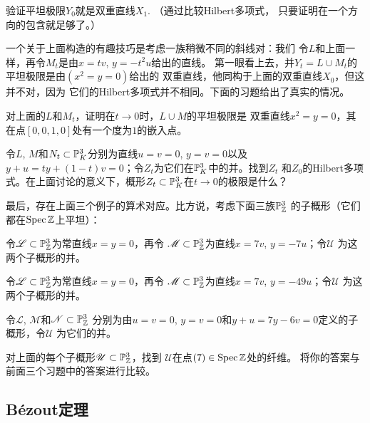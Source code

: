 \begin{exe}\label{exe:3.67}
验证平坦极限$Y_0$就是双重直线$X_1$. （通过比较Hilbert多项式，
只要证明在一个方向的包含就足够了。）
\end{exe}

一个关于上面构造的有趣技巧是考虑一族稍微不同的斜线对：我们
令$L$和上面一样，再令$M_t$是由$x=tv$, $y=-t^2u$给出的直线。
第一眼看上去，并$Y_t=L\cup M_t$的平坦极限是由$(x^2=y=0)$给出的
双重直线，他同构于上面的双重直线$X_0$，但这并不对，因为
它们的Hilbert多项式并不相同。下面的习题给出了真实的情况。

\begin{exe}\label{exe:3.68}
对上面的$L$和$M_t$，证明在$t\to 0$时，$L\cup M$的平坦极限是
双重直线$x^2=y=0$，其在点$[0,0,1,0]$处有一个度为$1$的嵌入点。
\end{exe}


\begin{exe}\label{exe:3.69}
令$L$, $M$和$N_t\subset \P_K^3$分别为直线$u=v=0$, $y=v=0$以及
$y+u=ty+(1-t)v=0$；令$Z_t$为它们在$\P_K^3$中的并。找到$Z_t$
和$Z_0$的Hilbert多项式。在上面讨论的意义下，概形$Z_t\subset 
\P_K^3$在$t\to 0$的极限是什么？
\end{exe}


最后，存在上面三个例子的算术对应。比方说，考虑下面三族$\P_\zz^3$
的子概形（它们都在$\spec \zz$上平坦）：
\begin{compactenum}[(a)]
\item 令$\mathscr L\subset \P_\zz^3$为常直线$x=y=0$，再令
$\mathscr M\subset \P_\zz^3$为直线$x=7v$, $y=-7u$；令$\mathscr U$
为这两个子概形的并。
\item 令$\mathscr L\subset \P_\zz^3$为常直线$x=y=0$，再令
$\mathscr M\subset \P_\zz^3$为直线$x=7v$, $y=-49u$；令$\mathscr U$
为这两个子概形的并。
\item 令$\mathscr L$, $\mathscr M$和$\mathscr N\subset \P_\zz^3$
分别为由$u=v=0$, $y=v=0$和$y+u=7y-6v=0$定义的子概形，令$\mathscr U$
为它们的并。
\end{compactenum}

\begin{exe}\label{exe:3.70}
对上面的每个子概形$\mathscr U\subset \P_\zz^3$，找到
$\mathscr U$在点$(7)\in\spec \zz$处的纤维。
将你的答案与前面三个习题中的答案进行比较。
\end{exe}

\subsection{B\texorpdfstring{\'{e}}{é}zout定理}
\label{s:3.3.5}

